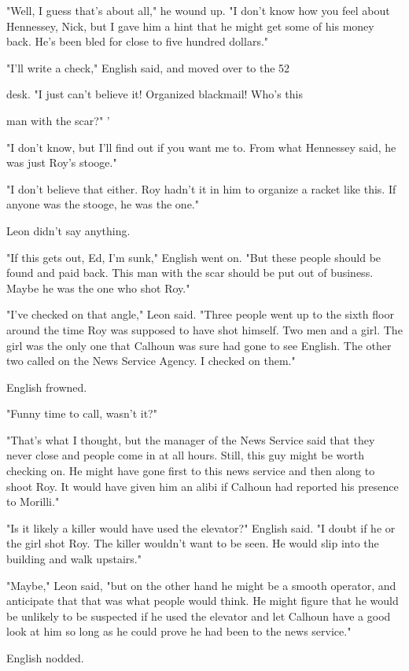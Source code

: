 \documentclass{novel}
\begin{document}
"Well, I guess that's about all," he wound up. "I don't know how you feel about Hennessey, Nick, but I gave him a hint that he might get some of his money back. He's been bled for close to five hundred dollars."

"I'll write a check," English said, and moved over to the 52



desk. "I just can't believe it! Organized blackmail! Who's this

man with the scar?"	\-'

"I don't know, but I'll find out if you want me to. From what Hennessey said, he was just Roy's stooge."

"I don't believe that either. Roy hadn't it in him to organize a racket like this. If anyone was the stooge, he was the one."

Leon didn't say anything.

"If this gets out, Ed, I'm sunk," English went on. "But these people should be found and paid back. This man with the scar should be put out of business. Maybe he was the one who shot Roy."

"I've checked on that angle," Leon said. "Three people went up to the sixth floor around the time Roy was supposed to have shot himself. Two men and a girl. The girl was the only one that Calhoun was sure had gone to see English. The other two called on the News Service Agency. I checked on them."

English frowned.

"Funny time to call, wasn't it?"

"That's what I thought, but the manager of the News Service said that they never close and people come in at all hours. Still, this guy might be worth checking on. He might have gone first to this news service and then along to shoot Roy. It would have given him an alibi if Calhoun had reported his presence to Morilli."

"Is it likely a killer would have used the elevator?" English said. "I doubt if he or the girl shot Roy. The killer wouldn't want to be seen. He would slip into the building and walk upstairs."

"Maybe," Leon said, "but on the other hand he might be a smooth operator, and anticipate that that was what people would think. He might figure that he would be unlikely to be suspected if he used the elevator and let Calhoun have a good look at him so long as he could prove he had been to the news service."

English nodded.
\end{document}
